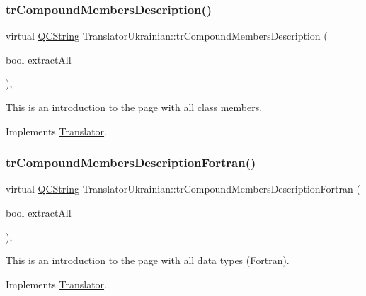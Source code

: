\subsubsection{\texorpdfstring{trCompoundMembersDescription()}{trCompoundMembersDescription()}}
{\footnotesize\ttfamily virtual \mbox{\hyperlink{class_q_c_string}{Q\+C\+String}} Translator\+Ukrainian\+::tr\+Compound\+Members\+Description (\begin{DoxyParamCaption}\item[{bool}]{extract\+All }\end{DoxyParamCaption})\hspace{0.3cm}{\ttfamily [inline]}, {\ttfamily [virtual]}}

This is an introduction to the page with all class members. 

Implements \mbox{\hyperlink{class_translator}{Translator}}.

\mbox{\label{class_translator_ukrainian_a0517cac0be1b2d9527b1b4becf6376c4}} 
\subsubsection{\texorpdfstring{trCompoundMembersDescriptionFortran()}{trCompoundMembersDescriptionFortran()}}
{\footnotesize\ttfamily virtual \mbox{\hyperlink{class_q_c_string}{Q\+C\+String}} Translator\+Ukrainian\+::tr\+Compound\+Members\+Description\+Fortran (\begin{DoxyParamCaption}\item[{bool}]{extract\+All }\end{DoxyParamCaption})\hspace{0.3cm}{\ttfamily [inline]}, {\ttfamily [virtual]}}

This is an introduction to the page with all data types (Fortran). 

Implements \mbox{\hyperlink{class_translator}{Translator}}.

\mbox{\label{class_translator_ukrainian_a1b9b18a4270a826c294eaae0eaaf7a19}} 

